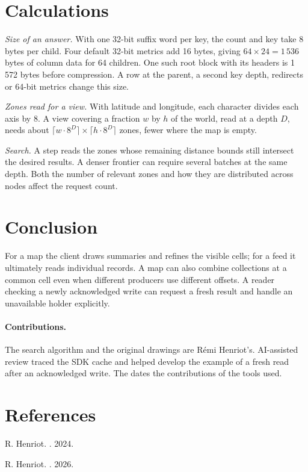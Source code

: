 \documentclass[11pt]{article}
\begin{document}
\section{Calculations}
\textit{Size of an answer.} With one 32-bit suffix word per key, the count and key take 8 bytes per child. Four default 32-bit metrics add 16 bytes, giving $64\times24=1\,536$ bytes of column data for 64 children. One such root block with its headers is 1\,572 bytes before compression. A row at the parent, a second key depth, redirects or 64-bit metrics change this size.

\textit{Zones read for a view.} With latitude and longitude, each character divides each axis by 8. A view covering a fraction $w$ by $h$ of the world, read at a depth $D$, needs about $\lceil w \cdot 8^{D} \rceil \times \lceil h \cdot 8^{D} \rceil$ zones, fewer where the map is empty.

\textit{Search.} A step reads the zones whose remaining distance bounds still intersect the desired results. A denser frontier can require several batches at the same depth. Both the number of relevant zones and how they are distributed across nodes affect the request count.

\section{Conclusion}
For a map the client draws summaries and refines the visible cells; for a feed it ultimately reads individual records. A map can also combine collections at a common cell even when different producers use different offsets. A reader checking a newly acknowledged write can request a fresh result and handle an unavailable holder explicitly.

\paragraph{Contributions.} The search algorithm and the original drawings are Rémi Henriot's. AI-assisted review traced the SDK cache and helped develop the example of a fresh read after an acknowledged write. The  dates the contributions of the tools used.

\section*{References}
\begin{enumerate}[label={[\arabic*]},leftmargin=2em,itemsep=1pt]
  \item \hypertarget{reference:1}{}R. Henriot. . 2024.
  \item \hypertarget{reference:2}{}R. Henriot. . 2026.
\end{enumerate}
\end{document}
